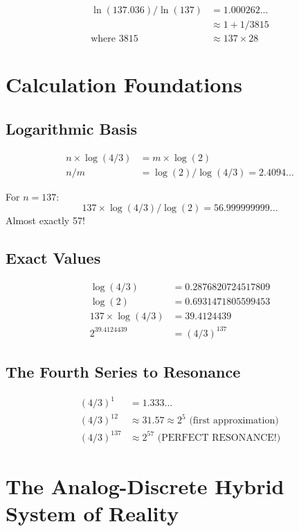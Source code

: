 	\begin{align}
		\ln(137.036) / \ln(137) &= 1.000262...\\
		&\approx 1 + 1/3815\\
		\text{where } 3815 &\approx 137 \times 28
	\end{align}
	
	\section{Calculation Foundations}
	
	\subsection{Logarithmic Basis}
	
	\begin{align}
		n \times \log(4/3) &= m \times \log(2)\\
		n/m &= \log(2)/\log(4/3) = 2.4094...
	\end{align}
	
	For $n=137$:
	\begin{equation}
		137 \times \log(4/3) / \log(2) = 56.999999999...
	\end{equation}
	Almost exactly 57!
	
	\subsection{Exact Values}
	
	\begin{align}
		\log(4/3) &= 0.2876820724517809\\
		\log(2) &= 0.6931471805599453\\
		137 \times \log(4/3) &= 39.4124439\\
		2^{39.4124439} &= (4/3)^{137}
	\end{align}
	
	\subsection{The Fourth Series to Resonance}
	
	\begin{align}
		(4/3)^1 &= 1.333...\\
		(4/3)^{12} &\approx 31.57 \approx 2^5 \text{ (first approximation)}\\
		(4/3)^{137} &\approx 2^{57} \text{ (PERFECT RESONANCE!)}
	\end{align}
	
	\section{The Analog-Discrete Hybrid System of Reality}
	
